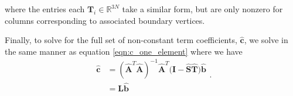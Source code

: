 where the entries each $\mathbf{T}_i \in \mathbb{R}^{3N}$ take a similar form, but are only nonzero for columns corresponding to associated boundary vertices.

Finally, to solve for the full set of non-constant term coefficients, $\hat{\mathbf{c}}$, we solve in the same manner as equation \ref{eqn:c_one_element} where we have
\begin{equation}
\label{eqn:c_multiple_elements}
\begin{split}
\hat{\mathbf{c}} & = (\hat{\mathbf{A}}^T\hat{\mathbf{A}})^{-1}\hat{\mathbf{A}}^T(\mathbf{I-\hat{S}\hat{T})\hat{\mathbf{b}}} \\
           & = \mathbf{L}\hat{\mathbf{b}}
\end{split}
\text{.}
\end{equation}


